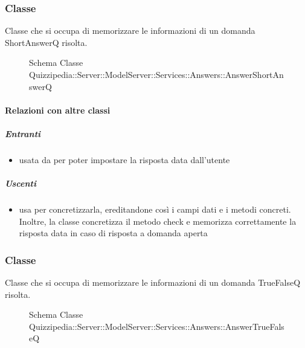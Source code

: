 \subsubsection{Classe }
Classe che si occupa di memorizzare le informazioni di un domanda ShortAnswerQ risolta.
\begin{figure}[H]
\centering
\noindent{}
\caption[Schema Classe AnswerShortAnswerQ]{Schema Classe Quizzipedia::Server::ModelServer::Services::Answers::AnswerShortAnswerQ}
\end{figure}
\paragraph{Relazioni con altre classi}
\subparagraph{Entranti}
\begin{itemize}
\item usata da  per poter impostare la risposta data dall'utente
\end{itemize}
\subparagraph{Uscenti}
\begin{itemize}
\item usa  per concretizzarla, ereditandone così i campi dati e i metodi concreti. Inoltre, la classe concretizza il metodo check e memorizza correttamente la risposta data in caso di risposta a domanda aperta
\end{itemize}
\subsubsection{Classe }
Classe che si occupa di memorizzare le informazioni di un domanda TrueFalseQ risolta.
\begin{figure}[H]
\centering
\noindent{}
\caption[Schema Classe AnswerTrueFalseQ]{Schema Classe Quizzipedia::Server::ModelServer::Services::Answers::AnswerTrueFalseQ}
\end{figure}
